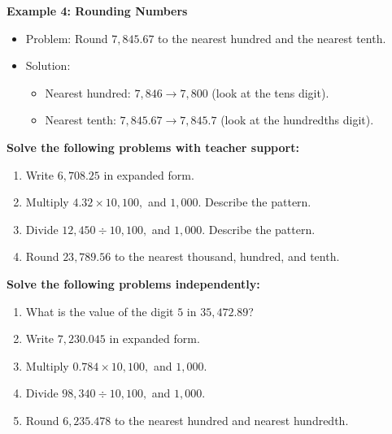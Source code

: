 \documentclass[12pt]{article}
\begin{document}
\begin{tcolorbox}[colframe=black!60, colback=white, 
coltitle=black, colbacktitle=black!15, fonttitle=\bfseries\Large, 
title=Examples, halign title=center, left=10pt, right=10pt, top=10pt, bottom=15pt]
\textbf{Example 4: Rounding Numbers}
\begin{itemize}
    \item Problem: Round \( 7,845.67 \) to the nearest hundred and the nearest tenth.
    \item Solution:
    \begin{itemize}
        \item Nearest hundred: \( 7,846 \to 7,800 \) (look at the tens digit).
        \item Nearest tenth: \( 7,845.67 \to 7,845.7 \) (look at the hundredths digit).
    \end{itemize}
\end{itemize}
\end{tcolorbox}

\vspace{1em}

\begin{tcolorbox}[colframe=black!60, colback=white, 
coltitle=black, colbacktitle=black!15, fonttitle=\bfseries\Large, 
title=Guided Practice, halign title=center, left=10pt, right=10pt, top=10pt, bottom=15pt]
\textbf{Solve the following problems with teacher support:}
\begin{enumerate}[itemsep=3em]
    \item Write \( 6,708.25 \) in expanded form.
    \item Multiply \( 4.32 \times 10, 100, \) and \( 1,000 \). Describe the pattern.
    \item Divide \( 12,450 \div 10, 100, \) and \( 1,000 \). Describe the pattern.
    \item Round \( 23,789.56 \) to the nearest thousand, hundred, and tenth.
\end{enumerate}
\end{tcolorbox}

\vspace{1em}

\begin{tcolorbox}[colframe=black!60, colback=white, 
coltitle=black, colbacktitle=black!15, fonttitle=\bfseries\Large, 
title=Independent Practice, halign title=center, left=10pt, right=10pt, top=10pt, bottom=15pt]
\textbf{Solve the following problems independently:}
\begin{enumerate}[itemsep=3em]
    \item What is the value of the digit \( 5 \) in \( 35,472.89 \)?
    \item Write \( 7,230.045 \) in expanded form.
    \item Multiply \( 0.784 \times 10, 100, \) and \( 1,000 \).
    \item Divide \( 98,340 \div 10, 100, \) and \( 1,000 \).
    \item Round \( 6,235.478 \) to the nearest hundred and nearest hundredth.
\end{enumerate}
\end{tcolorbox}
\end{document}
